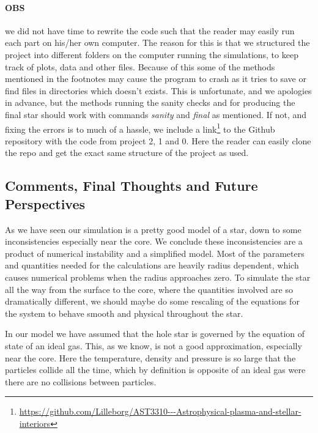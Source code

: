 \documentclass[11pt,a4paper,twocolumn,titlepage]{article}
\begin{document}
\paragraph{OBS} we did not have time to rewrite the code such that the reader may easily run each part on his/her own computer. The reason for this is that we structured the project into different folders on the computer running the simulations, to keep track of plots, data and other files. Because of this some of the methods mentioned in the footnotes may cause the program to crash as it tries to save or find files in directories which doesn't exists. This is unfortunate, and we apologies in advance, but the methods running the sanity checks and for producing the final star should work with commands \textit{sanity} and \textit{final} as mentioned. If not, and fixing the errors is to much of a hassle, we include a link\footnote{\url{https://github.com/Lilleborg/AST3310---Astrophysical-plasma-and-stellar-interiors}} to the Github repository with the code from project 2, 1 and 0. Here the reader can easily clone the repo and get the exact same structure of the project as used.

\subsection{Comments, Final Thoughts and Future Perspectives}\label{subsec:Conclusion/Comments}
As we have seen our simulation is a pretty good model of a star, down to some inconsistencies especially near the core. We conclude these inconsistencies are a product of numerical instability and a simplified model. Most of the parameters and quantities needed for the calculations are heavily radius dependent, which causes numerical problems when the radius approaches zero. To simulate the star all the way from the surface to the core, where the quantities involved are so dramatically different, we should maybe do some rescaling of the equations for the system to behave smooth and physical throughout the star.

In our model we have assumed that the hole star is governed by the equation of state of an ideal gas. This, as we know, is not a good approximation, especially near the core. Here the temperature, density and pressure is so large that the particles collide all the time, which by definition is opposite of an ideal gas were there are no collisions between particles.
\end{document}
